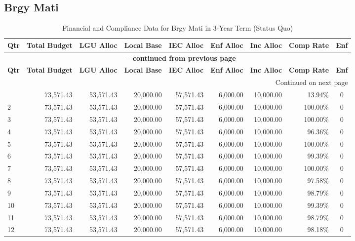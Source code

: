 \subsection{Brgy Mati}
\begin{longtable}{lrrrrrrrc}
\caption{Financial and Compliance Data for Brgy Mati in 3-Year Term (Status Quo)} \\
\toprule
\textbf{Qtr} & \textbf{Total Budget} & \textbf{LGU Alloc} & \textbf{Local Base} & \textbf{IEC Alloc} & \textbf{Enf Alloc} & \textbf{Inc Alloc} & \textbf{Comp Rate} & \textbf{Enf} \\
\midrule
\endfirsthead
\multicolumn{9}{c}{{\bfseries \tablename\ \thetable{} -- continued from previous page}} \\
\toprule
\textbf{Qtr} & \textbf{Total Budget} & \textbf{LGU Alloc} & \textbf{Local Base} & \textbf{IEC Alloc} & \textbf{Enf Alloc} & \textbf{Inc Alloc} & \textbf{Comp Rate} & \textbf{Enf} \\
\midrule
\endhead
\hline \multicolumn{9}{r}{{Continued on next page}} \\ \hline
\endfoot
\bottomrule
\endlastfoot
1 & 73,571.43 & 53,571.43 & 20,000.00 & 57,571.43 & 6,000.00 & 10,000.00 & 13.94\% & 0 \\
2 & 73,571.43 & 53,571.43 & 20,000.00 & 57,571.43 & 6,000.00 & 10,000.00 & 100.00\% & 0 \\
3 & 73,571.43 & 53,571.43 & 20,000.00 & 57,571.43 & 6,000.00 & 10,000.00 & 100.00\% & 0 \\
4 & 73,571.43 & 53,571.43 & 20,000.00 & 57,571.43 & 6,000.00 & 10,000.00 & 96.36\% & 0 \\
5 & 73,571.43 & 53,571.43 & 20,000.00 & 57,571.43 & 6,000.00 & 10,000.00 & 100.00\% & 0 \\
6 & 73,571.43 & 53,571.43 & 20,000.00 & 57,571.43 & 6,000.00 & 10,000.00 & 99.39\% & 0 \\
7 & 73,571.43 & 53,571.43 & 20,000.00 & 57,571.43 & 6,000.00 & 10,000.00 & 100.00\% & 0 \\
8 & 73,571.43 & 53,571.43 & 20,000.00 & 57,571.43 & 6,000.00 & 10,000.00 & 97.58\% & 0 \\
9 & 73,571.43 & 53,571.43 & 20,000.00 & 57,571.43 & 6,000.00 & 10,000.00 & 98.79\% & 0 \\
10 & 73,571.43 & 53,571.43 & 20,000.00 & 57,571.43 & 6,000.00 & 10,000.00 & 99.39\% & 0 \\
11 & 73,571.43 & 53,571.43 & 20,000.00 & 57,571.43 & 6,000.00 & 10,000.00 & 98.79\% & 0 \\
12 & 73,571.43 & 53,571.43 & 20,000.00 & 57,571.43 & 6,000.00 & 10,000.00 & 98.18\% & 0 \\
\end{longtable}
\clearpage

